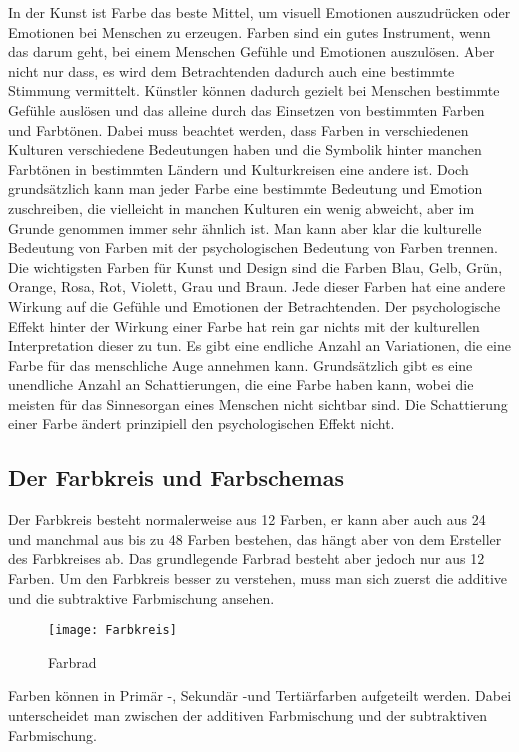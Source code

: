 In der Kunst ist Farbe das beste Mittel, um visuell Emotionen auszudrücken oder Emotionen bei Menschen zu erzeugen. Farben sind ein gutes Instrument, wenn das darum geht, bei einem Menschen Gefühle und Emotionen auszulösen. Aber nicht nur dass, es wird dem Betrachtenden dadurch auch eine bestimmte Stimmung vermittelt. Künstler können dadurch gezielt bei Menschen bestimmte Gefühle auslösen und das alleine durch das Einsetzen von bestimmten Farben und Farbtönen.
Dabei muss beachtet werden, dass Farben in verschiedenen Kulturen verschiedene Bedeutungen haben und die Symbolik hinter manchen Farbtönen in bestimmten Ländern und Kulturkreisen eine andere ist. Doch grundsätzlich kann man jeder Farbe eine bestimmte Bedeutung und Emotion zuschreiben, die vielleicht in manchen Kulturen ein wenig abweicht, aber im Grunde genommen immer sehr ähnlich ist.
Man kann aber klar die kulturelle Bedeutung von Farben mit der psychologischen Bedeutung von Farben trennen. Die wichtigsten Farben für Kunst und Design sind die Farben Blau, Gelb, Grün, Orange, Rosa, Rot, Violett, Grau und Braun. Jede dieser Farben hat eine andere Wirkung auf die Gefühle und Emotionen der Betrachtenden. Der psychologische Effekt hinter der Wirkung einer Farbe hat rein gar nichts mit der kulturellen Interpretation dieser zu tun. 
Es gibt eine endliche Anzahl an Variationen, die eine Farbe für das menschliche Auge annehmen kann. Grundsätzlich gibt es eine unendliche Anzahl an Schattierungen, die eine Farbe haben kann, wobei die meisten für das Sinnesorgan eines Menschen nicht sichtbar sind. Die Schattierung einer Farbe ändert prinzipiell den psychologischen Effekt nicht.
\cite{mollica2018special}

\subsection{Der Farbkreis und Farbschemas}
Der Farbkreis besteht normalerweise aus 12 Farben, er kann aber auch aus 24 und manchmal aus bis zu 48 Farben bestehen, das hängt aber von dem Ersteller des Farbkreises ab. Das grundlegende Farbrad besteht aber jedoch nur aus 12 Farben. Um den Farbkreis besser zu verstehen, muss man sich zuerst die additive und die subtraktive Farbmischung ansehen.  
\cite{mollica2018special}

\begin{figure}[H]
	\centering
	\texttt{[image: Farbkreis]}
	\caption{Farbrad\cite{_basicColorTheory}}
\end{figure}

Farben können in Primär -, Sekundär -und Tertiärfarben aufgeteilt werden. Dabei unterscheidet man zwischen der additiven Farbmischung und der subtraktiven Farbmischung. 


